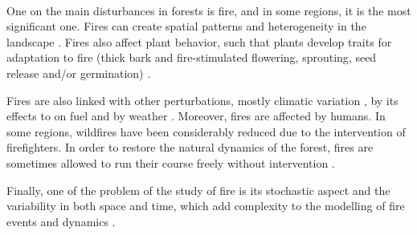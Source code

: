 \documentclass{article}
\begin{document}
\paragraph{}

One on the main disturbances in forests is fire, and in some regions, it is the most significant one. Fires can create spatial patterns and heterogeneity in the landscape \cite{skinner1996fire}. Fires also affect plant behavior, such that plants develop traits for adaptation to fire (thick  bark  and fire-stimulated flowering, sprouting, seed release and/or germination) \cite{mckelvey1996overview} \cite{chang1996ecosystem}.

Fires are also linked with other perturbations, mostly climatic variation \cite{mckenzie_climatic_2004}\cite{da2018dynamics}, by its effects to on fuel \cite{schoennagel_interaction_2004} and by weather \cite{fernandes_fire-smart_2013}.
Moreover, fires are affected by humans. In some regions, wildfires have been considerably reduced due to the intervention of firefighters. In order to restore the natural dynamics of the forest, fires are sometimes allowed to run their course freely without intervention \cite{wallenius2011major}. 

Finally, one of the problem of the study of fire is its stochastic aspect and the variability in both space and time, which add complexity to the modelling of fire events and dynamics \cite{agee1998landscape} \cite{lertzman1998three}.
\end{document}
